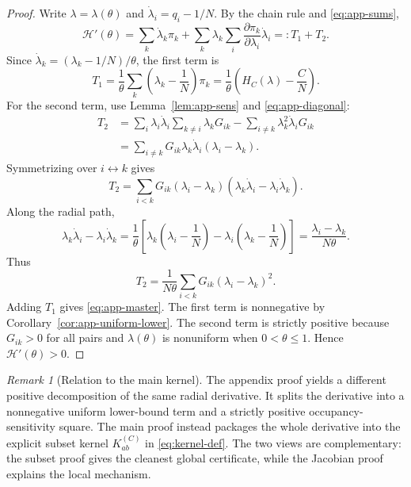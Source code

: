 \documentclass[11pt]{article}
\theoremstyle{remark}
\newtheorem{remark}[theorem]{Remark}
\begin{document}
\begin{proof}
Write $\lambda=\lambda(\theta)$ and
$\dot\lambda_i=q_i-1/N$.  By the chain rule and \eqref{eq:app-sums},
\[
        \mathcal H'(\theta)
        =
        \sum_k\dot\lambda_k\pi_k
        +
        \sum_k\lambda_k\sum_i
        \frac{\partial\pi_k}{\partial\lambda_i}\dot\lambda_i
        =:T_1+T_2.
\]
Since $\dot\lambda_k=(\lambda_k-1/N)/\theta$, the first term is
\[
        T_1
        =
        \frac1\theta\sum_k\left(\lambda_k-\frac1N\right)\pi_k
        =
        \frac1\theta\left(H_C(\lambda)-\frac{C}{N}\right).
\]
For the second term, use Lemma~\ref{lem:app-sens} and
\eqref{eq:app-diagonal}:
\begin{align*}
        T_2
        &=
        \sum_i\lambda_i\dot\lambda_i\sum_{k\ne i}\lambda_kG_{ik}
        -
        \sum_{i\ne k}\lambda_k^2\dot\lambda_iG_{ik} \\
        &=
        \sum_{i\ne k}G_{ik}\lambda_k\dot\lambda_i(\lambda_i-\lambda_k).
\end{align*}
Symmetrizing over $i\leftrightarrow k$ gives
\[
        T_2
        =
        \sum_{i<k}G_{ik}(\lambda_i-\lambda_k)
        (\lambda_k\dot\lambda_i-\lambda_i\dot\lambda_k).
\]
Along the radial path,
\[
        \lambda_k\dot\lambda_i-\lambda_i\dot\lambda_k
        =
        \frac1\theta
        \left[\lambda_k\left(\lambda_i-\frac1N\right)
              -\lambda_i\left(\lambda_k-\frac1N\right)\right]
        =
        \frac{\lambda_i-\lambda_k}{N\theta}.
\]
Thus
\[
        T_2
        =
        \frac{1}{N\theta}\sum_{i<k}G_{ik}(\lambda_i-\lambda_k)^2.
\]
Adding $T_1$ gives \eqref{eq:app-master}.  The first term is
nonnegative by Corollary~\ref{cor:app-uniform-lower}.  The second term is
strictly positive because $G_{ik}>0$ for all pairs and $\lambda(\theta)$
is nonuniform when $0<\theta\le1$.  Hence $\mathcal H'(\theta)>0$.
\end{proof}

\begin{remark}[Relation to the main kernel]
The appendix proof yields a different positive decomposition of the same
radial derivative.  It splits the derivative into a nonnegative uniform
lower-bound term and a strictly positive occupancy-sensitivity square.
The main proof instead packages the whole derivative into the explicit
subset kernel $K_{ab}^{(C)}$ in \eqref{eq:kernel-def}.  The two views are
complementary: the subset proof gives the cleanest global certificate,
while the Jacobian proof explains the local mechanism.
\end{remark}
\end{document}
